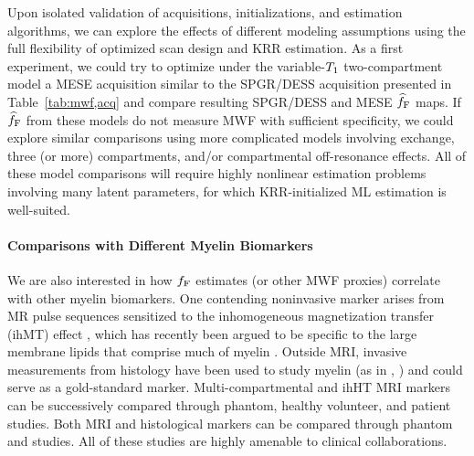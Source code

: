 Upon isolated validation
of acquisitions, initializations, and estimation algorithms,
we can explore the effects 
of different modeling assumptions
using the full flexibility
of optimized scan design and KRR estimation.
As a first experiment,
we could try to optimize
under the variable-$T_1$ two-compartment model 
a MESE acquisition
similar to the SPGR/DESS acquisition 
presented in Table~\ref{tab:mwf,acq}
and compare resulting SPGR/DESS and MESE $\widehat{f}_{\mathrm{F}}$ maps. 
If $\widehat{f}_{\mathrm{F}}$ from these models do not measure MWF
with sufficient specificity,
we could explore similar comparisons
using more complicated models
involving exchange, three (or more) compartments,
and/or compartmental off-resonance effects.
All of these model comparisons 
will require highly nonlinear estimation problems
involving many latent parameters,
for which KRR-initialized ML estimation is well-suited.

\paragraph{Comparisons with Different Myelin Biomarkers}
We are also interested
in how $f_{\mathrm{F}}$ estimates (or other MWF proxies)
correlate with other myelin biomarkers. 
One contending noninvasive marker arises
from MR pulse sequences sensitized
to the inhomogeneous magnetization transfer (ihMT) effect
\cite{varma:15:mtf},
which has recently been argued
to be specific
to the large membrane lipids
that comprise much of myelin
\cite{varma:15:iom, swanson:17:mda}.
Outside MRI,
invasive measurements
from histology
have been used to study myelin 
(as in \eg, \cite{gareau:00:mta, webb:03:imt})
and could serve as a gold-standard \insitu marker.
Multi-compartmental and ihHT MRI markers 
can be successively compared 
through phantom, healthy volunteer, and patient studies.
Both MRI and histological markers
can be compared through 
phantom and \insitu studies.
All of these studies
are highly amenable 
to clinical collaborations.
